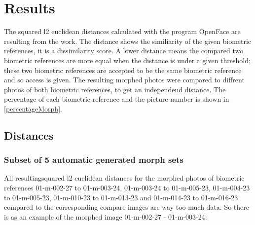 \section{Results}
\label{Results}
The squared l2 euclidean distances calculated with the program OpenFace are resulting from the work. The distance shows the similiarity of the given biometric references, it is a dissimilarity score. A lower distance means the compared two biometric references are more equal when the distance is under a given threshold; these two biometric references are accepted to be the same biometric reference and so access is given. The resulting morphed photos were compared to diffrent photos of both biometric references, to get an independend distance. The percentage of each biometric reference and the picture number is shown in \ref{percentageMorph}.
\subsection{Distances}

\subsubsection{Subset of 5 automatic generated morph sets}\label{sec:subset5}

All resultingsquared l2 euclidean distances for the morphed photos of biometric references 01-m-002-27 to 01-m-003-24, 01-m-003-24 to 01-m-005-23, 01-m-004-23 to 01-m-005-23, 01-m-010-23 to 01-m-013-23 and 01-m-014-23 to 01-m-016-23 compared to the corresponding compare images are way too much data. So there is as an example of the morphed image 01-m-002-27 - 01-m-003-24:

